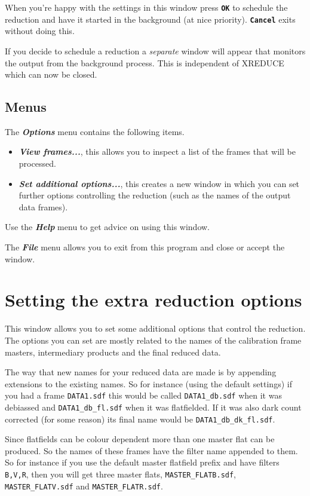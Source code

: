 \documentclass[11pt,nolof]{starlink}
\providecommand{\butt}[1]{{\bf \tt #1}}
\providecommand{\menu}[1]{{\bf \em #1}}
\providecommand{\text}[1]{{\tt #1}}
\begin{document}

When you're happy with the settings in this window press \butt{OK} to
schedule the reduction and have it started in the background (at nice
priority). \butt{Cancel} exits without doing this.

If you decide to schedule a reduction a {\em separate} window will
appear that monitors the output from the background process. This
is independent of XREDUCE which can now be closed.

\subsection{Menus }
The \menu{Options} menu contains the following items.
\begin{itemize}
\item \menu{View frames...}, this allows you to inspect a list of the
frames that will be processed.
\item \menu{Set additional options...}, this creates a new window in
which you can set further options controlling the reduction (such as
the names of the output data frames).
\end{itemize}

Use the \menu{Help} menu to get advice on using this window.

The \menu{File} menu allows you to exit from this program and close or
accept the window.

\section{Setting the extra reduction options }
This window allows you to set some additional options that control the
reduction. The options you can set are mostly related to the
names of the calibration frame masters, intermediary products and the
final reduced data.

The way that new names for your reduced data are made is by appending
extensions to the existing names. So for instance (using the default
settings) if you had a frame \text{DATA1.sdf} this would be called
\text{DATA1\_db.sdf} when it was debiassed and \text{DATA1\_db\_fl.sdf} when
it was flatfielded. If it was also dark count corrected (for some
reason) its final name would be \text{DATA1\_db\_dk\_fl.sdf}.

Since flatfields can be colour dependent more than one master flat can
be produced. So the names of these frames have the filter name appended
to them. So for instance if you use the default master flatfield
prefix and have filters \text{B,V,R}, then you will get three master
flats, \text{MASTER\_FLATB.sdf}, \text{MASTER\_FLATV.sdf} and
\text{MASTER\_FLATR.sdf}.
\end{document}
